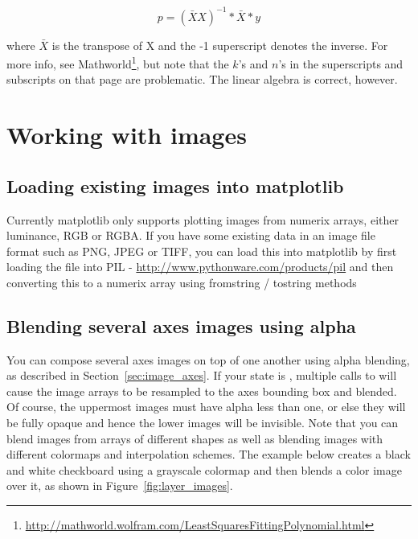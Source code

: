 \documentclass[twoside]{book}
\begin{document}
\begin{equation}
  p = (\bar{X} X)^{-1} * \bar{X} * y
\end{equation}
      
\noindent where $\bar{X}$ is the transpose of X and the -1 superscript
denotes the inverse.  For more info, see
Mathworld\footnote{\url{http://mathworld.wolfram.com/LeastSquaresFittingPolynomial.html}},
but note that the $k$'s and $n$'s in the superscripts and subscripts
on that page are problematic.  The linear algebra is correct, however.




\section{Working with images}

\subsection{Loading existing images into matplotlib}
\label{cbook:image_files}
Currently matplotlib only supports plotting images from numerix
arrays, either luminance, RGB or RGBA.  If you have some existing data
in an image file format such as PNG, JPEG or TIFF, you can load this
into matplotlib by first loading the file into PIL -
\url{http://www.pythonware.com/products/pil} and then converting this
to a numerix array using fromstring / tostring methods



\subsection{Blending several axes images using alpha}
\label{cbook:layer_images}

You can compose several axes images on top of one another using alpha
blending, as described in Section~\ref{sec:image_axes}.  If your
 state is , multiple calls to
 will cause the image arrays to be resampled to the
axes bounding box and blended.  Of course, the uppermost images must
have alpha less than one, or else they will be fully opaque and hence
the lower images will be invisible.  Note that you can blend images
from arrays of different shapes as well as blending images with
different colormaps and interpolation schemes.  The example below
creates a black and white checkboard using a grayscale colormap and
then blends a color image over it, as shown in
Figure~\ref{fig:layer_images}.
\end{document}
